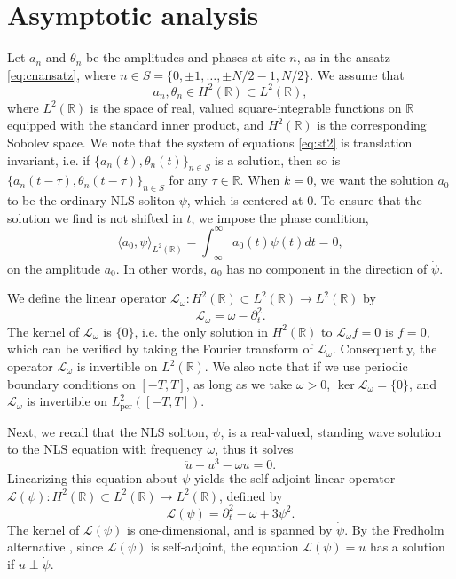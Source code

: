 \documentclass[11pt,reqno]{amsart}
\def\R{{\mathbb R}}
\def\calL{{\mathcal L}}
\def\Lw{{\mathcal{L}_\omega}}
\begin{document}
\section{Asymptotic analysis}\label{app:asymp}

Let $a_n$ and $\theta_n$ be the amplitudes and phases at site $n$, as in the ansatz \cref{eq:cnansatz}, where $n \in S = \{ 0, \pm 1, \dots, \pm N/2-1, N/2 \}$. We assume that 
\[
a_n, \theta_n \in H^2(\R) \subset L^2(\R),
\]
where $L^2(\R)$ is the space of real, valued square-integrable functions on $\R$ equipped with the standard inner product, and $H^2(\R)$ is the corresponding Sobolev space. We note that the system of equations \cref{eq:st2} is translation invariant, i.e. if $\{ a_n(t), \theta_n(t)\}_{n\in S}$ is a solution, then so is $\{ a_n(t-\tau), \theta_n(t-\tau)\}_{n\in S}$ for any $\tau \in \R$. When $k = 0$, we want the solution $a_0$ to be the ordinary NLS soliton $\psi$, which is centered at 0. To ensure that the solution we find is not shifted in $t$, we impose the phase condition,
\begin{equation}\label{eq:phasecond}
\langle a_0, \dot{\psi} \rangle_{L^2(\R)} = \int_{-\infty}^\infty a_0(t) \dot{\psi}(t) dt = 0,
\end{equation}
on the amplitude $a_0$. In other words, $a_0$ has no component in the direction of $\dot{\psi}$.

We define the linear operator $\Lw: H^2(\R) \subset L^2(\R) \rightarrow L^2(\R)$ by
\begin{equation}\label{eq:Lw}
\Lw = \omega - \partial_t^2.
\end{equation}
The kernel of $\Lw$ is $\{0\}$, i.e. the only solution in $H^2(\R)$ to $\Lw f = 0$ is $f = 0$, which can be verified by taking the Fourier transform of $\Lw$. Consequently, the operator $\Lw$ is invertible on $L^2(\R)$. We also note that if we use periodic boundary conditions on $[-T,T]$, as long as we take $\omega > 0$, $\ker \Lw = \{0\}$, and $\Lw$ is invertible on $L^2_{\text{per}}([-T,T])$.

Next, we recall that the NLS soliton, $\psi$, is a real-valued, standing wave solution to the NLS equation with frequency $\omega$, thus it solves 
\begin{equation}\label{eq:NLSreal}
\ddot{u} + u^3 - \omega u = 0. 
\end{equation}
Linearizing this equation about $\psi$ yields the self-adjoint linear operator $\calL(\psi): H^2(\R) \subset L^2(\R) \rightarrow L^2(\R)$, defined by
\begin{equation}\label{eq:Lpsi}
\calL(\psi) = \partial_t^2 - \omega + 3 \psi^2.
\end{equation}
The kernel of $\calL(\psi)$ is one-dimensional, and is spanned by $\dot{\psi}$. By the Fredholm alternative \cite{Ramm2001}, since $\calL(\psi)$ is self-adjoint, the equation $\calL(\psi) = u$ has a solution if $u \perp \dot{\psi}$.
\end{document}
